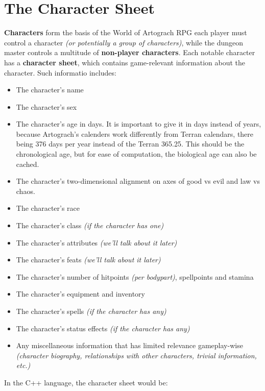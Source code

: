 \documentclass[openany,11pt,a4paper]{book}
\begin{document}
\chapter{The Character Sheet}
\textbf{Characters} form the basis of the World of Artograch RPG \textemdash each player must control a character \textit{(or potentially a group of characters)}, while the dungeon master controls a multitude of \textbf{non-player characters}. Each notable character has a \textbf{character sheet}, which contains game-relevant information about the character. Such informatio includes:
\begin{itemize}
\item The character's name
\item The character's sex
\item The character's age in days. It is important to give it in days instead of years, because Artograch's calenders work differently from Terran calendars, there being 376 days per year instead of the Terran 365.25. This should be the chronological age, but for ease of computation, the biological age can also be cached.
\item The character's two-dimensional alignment on axes of good vs evil and law vs chaos.
\item The character's race
\item The character's class \textit{(if the character has one)}
\item The character's attributes \textit{(we'll talk about it later)}
\item The character's feats \textit{(we'll talk about it later)}
\item The character's number of hitpoints \textit{(per bodypart)}, spellpoints and stamina
\item The character's equipment and inventory
\item The character's spells \textit{(if the character has any)}
\item The character's status effects \textit{(if the character has any)}
\item Any miscellaneous information that has limited relevance gameplay-wise \textit{(character biography, relationships with other characters, trivial information, etc.)}
\end{itemize}
In the C++ language, the character sheet would be:
\end{document}
